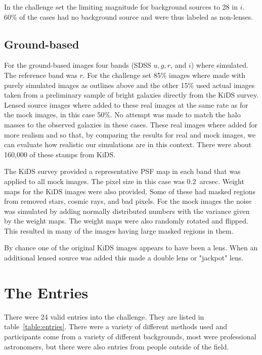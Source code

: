 \documentclass[useAMS,usenatbib]{mnras}
\begin{document}
 In the challenge set the limiting magnitude for background sources to 28 in $i$.   60\% of the cases had no background source and were thus labeled as non-lenses.
 
\subsection{Ground-based}
\label{sec:sim-ground-based}

For the ground-based images four bands (SDSS $u,g,r$, and $i$) where simulated.  The reference band was $r$.  For the challenge set 85\% images where made with purely simulated images as outlines above and the other 15\% used actual images taken from a preliminary sample of bright galaxies directly from the KiDS survey.  Lensed source images where added to these real images at the same rate as for the mock images,  in this case 50\%.  No attempt was made to match the halo masses to the observed galaxies in these cases.  These real images where added for more realism and so that, by comparing the results for real and mock images, we can evaluate how realistic our simulations are in this context.  There were about 160,000 of these stamps from KiDS.

The KiDS survey provided a representative PSF map in each band that was applied to all mock images.   The pixel size in this case was 0.2~arcsec. 
Weight maps for the KiDS images were also provided.  Some of these had masked regions from removed stars, cosmic rays, and bad pixels.  For the mock images the noise was simulated by adding normally distributed numbers with the variance given by the weight maps.  The weight maps were also randomly rotated and flipped.  This resulted in many of the images having large masked regions in them.

By chance one of the original KiDS images appears to have been a lens.  When an additional lensed source was added this made a double lens or "jackpot" lens.

\section{The Entries}
\label{sec:entries}

There were 24 valid entries into the challenge.  They are listed in table~\ref{table:entries}.  There were a variety of different methods used and participants come from a variety of different backgrounds, most were professional astronomers, but there were also entries from people outside of the field.  
\end{document}
